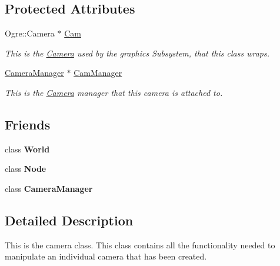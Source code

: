 \subsection*{Protected Attributes}
\begin{DoxyCompactItemize}
\item 
Ogre::Camera $\ast$ \hyperlink{classphys_1_1Camera_a91622148b9b9a9ae1554c828f7e2fc89}{Cam}
\begin{DoxyCompactList}\small\item\em This is the \hyperlink{classphys_1_1Camera}{Camera} used by the graphics Subsystem, that this class wraps. \item\end{DoxyCompactList}\item 
\hyperlink{classphys_1_1CameraManager}{CameraManager} $\ast$ \hyperlink{classphys_1_1Camera_a909203ede748deb1b587a8758ba8cec4}{CamManager}
\begin{DoxyCompactList}\small\item\em This is the \hyperlink{classphys_1_1Camera}{Camera} manager that this camera is attached to. \item\end{DoxyCompactList}\end{DoxyCompactItemize}
\subsection*{Friends}
\begin{DoxyCompactItemize}
\item 
\hypertarget{classphys_1_1Camera_a7b4bcdf992c21ae83363f25df05b1d25}{
class {\bfseries World}}
\label{d9/df8/classphys_1_1Camera_a7b4bcdf992c21ae83363f25df05b1d25}

\item 
\hypertarget{classphys_1_1Camera_a6db9d28bd448a131448276ee03de1e6d}{
class {\bfseries Node}}
\label{d9/df8/classphys_1_1Camera_a6db9d28bd448a131448276ee03de1e6d}

\item 
\hypertarget{classphys_1_1Camera_afae5bf9a900e8c5bc70c9332785e8465}{
class {\bfseries CameraManager}}
\label{d9/df8/classphys_1_1Camera_afae5bf9a900e8c5bc70c9332785e8465}

\end{DoxyCompactItemize}


\subsection{Detailed Description}
This is the camera class. This class contains all the functionality needed to manipulate an individual camera that has been created. 

